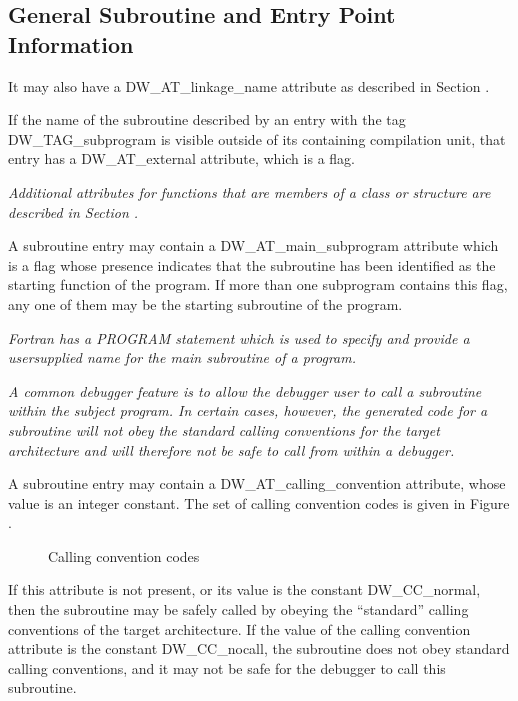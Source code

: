 \subsection{General Subroutine and Entry Point Information}
\label{chap:generalsubroutineandentrypointinformation}

It may also have a DW\_AT\_linkage\_name attribute as
described in Section .

If the name of the subroutine described by an entry with the
tag DW\_TAG\_subprogram is visible outside of its containing
compilation unit, that entry has a DW\_AT\_external attribute,
which is a flag.

\textit{Additional attributes for functions that are members of a
class or structure are described in 
Section .
}

A subroutine entry may contain a DW\_AT\_main\_subprogram
attribute which is a flag whose presence indicates that the
subroutine has been identified as the starting function of
the program.  If more than one subprogram contains this flag,
any one of them may be the starting subroutine of the program.

\textit{Fortran has a PROGRAM statement which is used to specify
and provide a user\dash supplied name for the main subroutine of
a program.
}

\textit{A common debugger feature is to allow the debugger user to call
a subroutine within the subject program. In certain cases,
however, the generated code for a subroutine will not obey
the standard calling conventions for the target architecture
and will therefore not be safe to call from within a debugger.
}

A subroutine entry may contain a DW\_AT\_calling\_convention
attribute, whose value is an integer constant. The set of
calling convention codes is given in 
Figure .

\begin{figure}[here]
\caption{Calling convention codes}\label{fig:callingconventioncodes}
\end{figure}

If this attribute is not present, or its value is the constant
DW\_CC\_normal, then the subroutine may be safely called by
obeying the ``standard'' calling conventions of the target
architecture. If the value of the calling convention attribute
is the constant DW\_CC\_nocall, the subroutine does not obey
standard calling conventions, and it may not be safe for the
debugger to call this subroutine.

